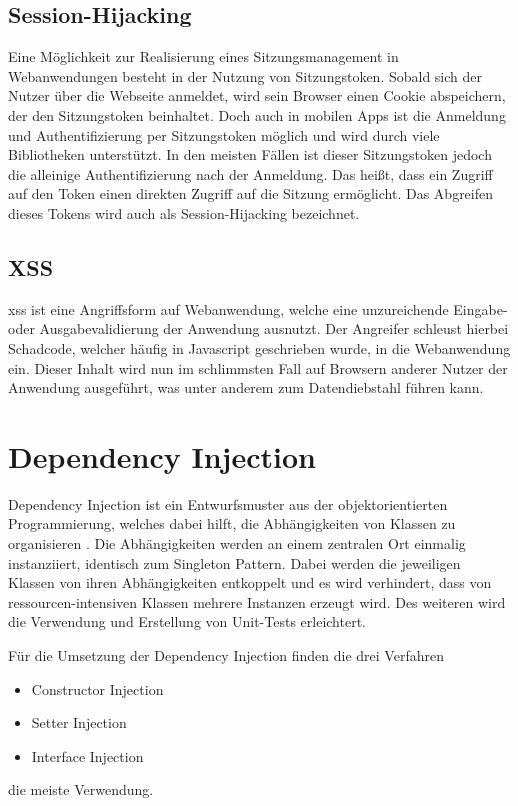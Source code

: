 \subsection{Session-Hijacking}
Eine Möglichkeit zur Realisierung eines Sitzungsmanagement in Webanwendungen besteht in der Nutzung von Sitzungstoken.
Sobald sich der Nutzer über die Webseite anmeldet, wird sein Browser einen Cookie abspeichern, der den Sitzungstoken beinhaltet. Doch auch in mobilen Apps ist die Anmeldung und Authentifizierung per Sitzungstoken möglich und wird durch viele Bibliotheken unterstützt.
In den meisten Fällen ist dieser Sitzungstoken jedoch die alleinige Authentifizierung nach der Anmeldung.
Das heißt, dass ein Zugriff auf den Token einen direkten Zugriff auf die Sitzung ermöglicht.
Das Abgreifen dieses Tokens wird auch als Session-Hijacking bezeichnet.

\subsection{XSS}
\gls{xss} ist eine Angriffsform auf Webanwendung, welche eine unzureichende Eingabe- oder Ausgabevalidierung der Anwendung ausnutzt.
Der Angreifer schleust hierbei Schadcode, welcher häufig in Javascript geschrieben wurde, in die Webanwendung ein.
Dieser Inhalt wird nun im schlimmsten Fall auf Browsern anderer Nutzer der Anwendung ausgeführt, was unter anderem zum Datendiebstahl führen kann.

\clearpage
 
\section{Dependency Injection} \label{dependencyinjection}
Dependency Injection ist ein Entwurfsmuster aus der objektorientierten Programmierung, welches dabei hilft, die Abhängigkeiten von Klassen zu organisieren \cite[S.~27]{dependency-book}. Die Abhängigkeiten werden an einem zentralen Ort einmalig instanziiert, identisch zum Singleton Pattern. Dabei werden die jeweiligen Klassen von ihren Abhängigkeiten entkoppelt und es wird verhindert, dass von ressourcen-intensiven Klassen mehrere Instanzen erzeugt wird. Des weiteren wird die Verwendung und Erstellung von Unit-Tests erleichtert.

Für die Umsetzung der Dependency Injection finden die drei Verfahren
\begin{itemize}
	\item Constructor Injection
	\item Setter Injection
	\item Interface Injection
\end{itemize}
die meiste Verwendung.

